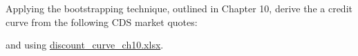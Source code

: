 \begin{Exercise}[title={(Boostrapping Reprise)}]
Applying the bootstrapping technique, outlined in Chapter 10, derive the a credit curve from the following CDS market quotes:

\begin{Shaded}
\begin{Highlighting}[]
\OperatorTok{=}\NormalTok{, }\NormalTok{, }\NormalTok{)}

\OperatorTok{=}\NormalTok{ [}
\NormalTok{    \{}\NormalTok{: }\NormalTok{, }\NormalTok{:}\NormalTok{\},}
\NormalTok{    \{}\NormalTok{: }\NormalTok{, }\NormalTok{:}\NormalTok{\},}
\NormalTok{    \{}\NormalTok{: }\NormalTok{, }\NormalTok{:}\NormalTok{\},}
\NormalTok{    \{}\NormalTok{: }\NormalTok{, }\NormalTok{:}\NormalTok{\},}
\NormalTok{    \{}\NormalTok{: }\NormalTok{, }\NormalTok{:}\NormalTok{\},}
\NormalTok{    \{}\NormalTok{: }\NormalTok{, }\NormalTok{:}\NormalTok{\},}
\NormalTok{]}
\end{Highlighting}
\end{Shaded}
and using \href{https://drive.google.com/file/d/1mugHyet3H9tcSAvYvt8G4_kpfaEbVY7b/view?usp=sharing}{discount\_curve\_ch10.xlsx}.
\end{Exercise}

